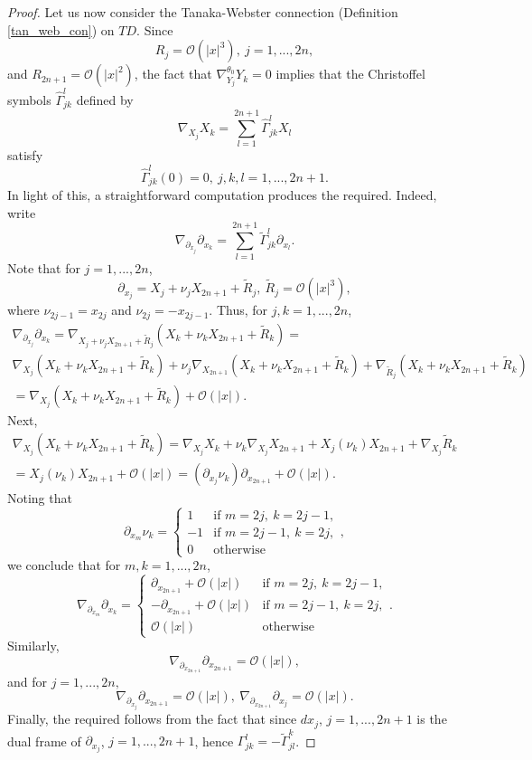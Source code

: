 \documentclass{article}
\newcommand{\mco}{\mathcal O}
\begin{document}
\begin{proof}
Let us now consider the Tanaka-Webster connection (Definition \ref{tan_web_con}) on $TD$. Since $$R_j = \mco(|x|^3),\ j = 1,...,2n,$$ and $R_{2n+1} = \mco(|x|^2)$, the fact that $\nabla^{\theta_0}_{Y_j} Y_k = 0$ implies that the Christoffel symbols $\hat \Gamma_{jk}^l$ defined by $$\nabla_{X_j} X_k = \sum_{l=1}^{2n+1} \hat \Gamma^l_{jk} X_l$$ satisfy $$\hat \Gamma_{jk}^l(0) = 0,\ j,k,l = 1,...,2n+1.$$ In light of this, a straightforward computation produces the required. Indeed, write $$\nabla_{\partial_{x_j}} \partial_{x_k} = \sum_{l = 1}^{2n+1} \tilde \Gamma^l_{jk} \partial_{x_l}.$$
Note that for $j = 1,...,2n$, $$\partial_{x_j} = X_j + \nu_j X_{2n+1} + \tilde R_j,\ \tilde R_j = \mco(|x|^3),$$
where $\nu_{2j-1} = x_{2j}$ and $\nu_{2j} = -x_{2j-1}$. Thus, for $j,k = 1,...,2n$,
%
\begin{multline*} \nabla_{\partial_{x_j}} \partial_{x_k} = \nabla_{X_j + \nu_j X_{2n+1} + \tilde R_j} (X_k + \nu_k X_{2n+1} + \tilde R_k) = \\ \nabla_{X_j}(X_k + \nu_k X_{2n+1} + \tilde R_k)+ \nu_j \nabla_{X_{2n+1}}(X_k + \nu_k X_{2n+1} + \tilde R_k) + \nabla_{\tilde R_j}(X_k + \nu_k X_{2n+1} + \tilde R_k)\\ = \nabla_{X_j}(X_k + \nu_k X_{2n+1} + \tilde R_k) + \mco(|x|).\end{multline*}
Next,
%
\begin{multline*} \nabla_{X_j}(X_k + \nu_k X_{2n+1} + \tilde R_k) = \nabla_{X_j} X_k  + \nu_k \nabla_{X_j} X_{2n+1} + X_j(\nu_k) X_{2n+1} + \nabla_{X_j} \tilde R_k\\ = X_j(\nu_k) X_{2n+1} + \mco(|x|) = \left(\partial_{x_j} \nu_k \right)\partial_{x_{2n+1}} + \mco(|x|).\end{multline*}
Noting that $$\partial_{x_m} \nu_k = \left\{\begin{array}{ll} 1 & \text{if } m = 2j,\ k = 2j-1,\\ -1 & \text{if } m = 2j-1,\ k = 2j,\\ 0 & \text{otherwise} \end{array}\right.,$$
we conclude that for $m, k = 1,...,2n$, $$\nabla_{\partial_{x_m}}\partial_{x_k} = \left\{\begin{array}{ll}\partial_{x_{2n+1}} + \mco(|x|) & \text{if } m = 2j,\ k = 2j-1,\\ -\partial_{x_{2n+1}} + \mco(|x|) & \text{if } m = 2j-1,\ k = 2j,\\ \mco(|x|)& \text{otherwise} \end{array}\right. .$$
Similarly, $$\nabla_{\partial_{x_{2n+1}}} \partial_{x_{2n+1}} = \mco(|x|),$$
and for $j = 1,...,2n,$ $$\nabla_{\partial_{x_j}} \partial_{x_{2n+1}} = \mco(|x|),\ \nabla_{\partial_{x_{2n+1}}} \partial_{x_j} = \mco(|x|).$$
Finally, the required follows from the fact that since $dx_j$, $j = 1,...,2n+1$ is the dual frame of $\partial_{x_j}$, $j = 1,...,2n+1$, hence $\Gamma^l_{jk} = - \tilde \Gamma^k_{jl}$.
\end{proof}
\end{document}
